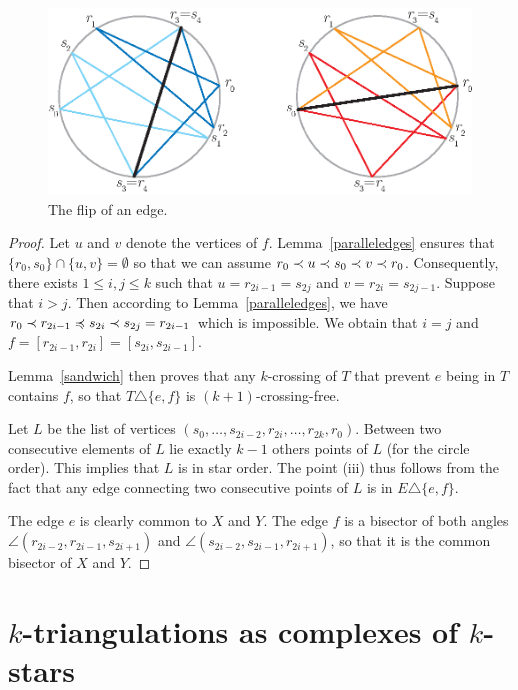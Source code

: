 \documentclass[12pt]{amsart}
\begin{document}
\begin{figure}
\centerline{\includegraphics[scale=1]{flip.eps}}
\caption{\small{The flip of an edge.}}\label{fig:flip}
\end{figure}

\begin{proof}
Let $u$ and $v$ denote the vertices of $f$.
Lemma~\ref{paralleledges} ensures that $\{r_0,s_0\}\cap\{u,v\}=\emptyset$ so that we can assume $r_0\prec u\prec s_0\prec v\prec r_0$. Consequently, there exists $1\le i,j\le k$ such that $u=r_{2i-1}=s_{2j}$ and $v=r_{2i}=s_{2j-1}$. Suppose that $i>j$. Then according to Lemma~\ref{paralleledges}, we have $r_0\prec r_{2i-1}\preccurlyeq s_{2i}\prec s_{2j}=r_{2i-1}$ which is impossible. We obtain that $i=j$ and $f=[r_{2i-1},r_{2i}]=[s_{2i},s_{2i-1}]$.

Lemma~\ref{sandwich} then proves that any $k$-crossing of $T$ that prevent $e$ being in $T$ contains $f$, so that $T\triangle\{e,f\}$ is $(k+1)$-crossing-free.

Let $L$ be the list of vertices $(s_0,\ldots,s_{2i-2},r_{2i},\ldots,r_{2k},r_0)$. Between two consecutive elements of $L$ lie exactly $k-1$ others points of $L$ (for the circle order). This implies that $L$ is in star order. The point (iii) thus follows from the fact that any edge connecting two consecutive points of $L$ is in $E\triangle\{e,f\}$.

The edge $e$ is clearly common to $X$ and $Y$. The edge $f$ is a bisector of both angles $\angle(r_{2i-2},r_{2i-1},s_{2i+1})$ and $\angle(s_{2i-2},s_{2i-1},r_{2i+1})$, so that it is the common bisector of $X$ and $Y$.
\end{proof}




\section{$k$-triangulations as complexes of $k$-stars}\label{sectioncomplexes}
\end{document}
